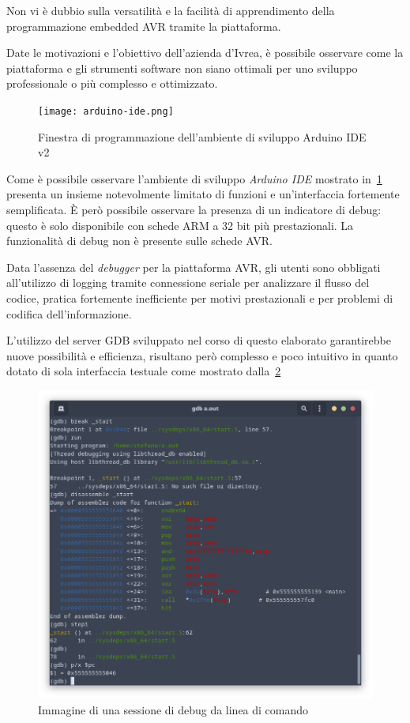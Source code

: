 Non vi è dubbio sulla versatilità e la facilità di apprendimento della programmazione embedded AVR tramite la piattaforma.

Date le motivazioni e l'obiettivo dell'azienda d'Ivrea, è possibile osservare come la piattaforma e gli strumenti software non siano ottimali per uno sviluppo professionale o più complesso e ottimizzato.

\begin{figure}
    \centering
    \texttt{[image: arduino-ide.png]}
    \caption[Immagine del software Arduino IDE v2]{Finestra di programmazione dell'ambiente di sviluppo Arduino IDE v2}\label{fig:arduino-ide}
\end{figure}

Come è possibile osservare l'ambiente di sviluppo \textit{Arduino IDE} mostrato in~\cref{fig:arduino-ide} presenta un insieme notevolmente limitato di funzioni e un'interfaccia fortemente semplificata. È però possibile osservare la presenza di un indicatore di debug: questo è solo disponibile con schede ARM a 32 bit più prestazionali. La funzionalità di debug non è presente sulle schede AVR.\@

Data l'assenza del \textit{debugger} per la piattaforma AVR, gli utenti sono obbligati all'utilizzo di logging tramite connessione seriale per analizzare il flusso del codice, pratica fortemente inefficiente per motivi prestazionali e per problemi di codifica dell'informazione.

L'utilizzo del server GDB sviluppato nel corso di questo elaborato garantirebbe nuove possibilità e efficienza, risultano però complesso e poco intuitivo in quanto dotato di sola interfaccia testuale come mostrato dalla~\cref{fig:gdb-cli}

\begin{figure}
    \centering
    \includegraphics[width=.7\textwidth]{gdb-cli.png}
    \caption[]{Immagine di una sessione di debug da linea di comando}\label{fig:gdb-cli}
\end{figure}

